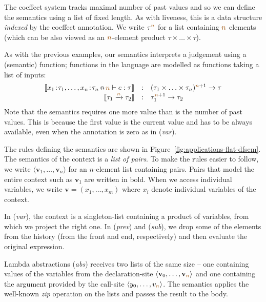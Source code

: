 The coeffect system tracks maximal number of past values and so we can define the semantics using
a list of fixed length. As with liveness, this is a data structure \emph{indexed} by the coeffect
annotation. We write $\tau^{\aclrd{n}}$ for a list containing $\aclrd{n}$ elements (which can be 
also viewed as an $\aclrd{n}$-element product $\tau \times \ldots \times \tau$). 

As with the previous examples, our semantics interprets a judgement using a (semantic) function;
functions in the language are modelled as functions taking a list of inputs:
%
\begin{equation*}
\begin{array}{rcl}
\sem{\coctx{x_1\!:\!\tau_1, \ldots, x_n\!:\!\tau_n}{ \aclrd{n} } \vdash e : \tau} 
  &:& (\tau_1 \times \ldots \times \tau_n)^{\aclrd{n}+1} \rightarrow \tau\\
\sem{\tau_1 \xrightarrow{\aclrd{n}} \tau_2} &:& \tau_1^{\aclrd{n}+1} \rightarrow \tau_2
\end{array}
\end{equation*}
%
Note that the semantics requires one more value than is the number of past values. This is because 
the first value is the current value and has to be always available, even when the annotation is
zero as in (\emph{var}).

The rules defining the semantics are shown in Figure~\ref{fig:applications-flat-dfsem}. The
semantics of the context is a \emph{list of pairs}. To make the rules easier to follow, we write
$\langle \mathbf{v}_1, \ldots, \mathbf{v}_n \rangle$ for an $n$-element list containing pairs.
Pairs that model the entire context such as $\mathbf{v}_1$ are written in bold. When we access
individual variables, we write $\mathbf{v} = (x_1, \ldots, x_m)$ where $x_i$ denote individual
variables of the context.

In (\emph{var}), the context is a singleton-list containing a product of variables, from which
we project the right one. In (\emph{prev}) and (\emph{sub}), we drop some of the elements from 
the history (from the front and end, respectively) and then evaluate the original expression.

Lambda abstractions (\emph{abs}) receives two lists of the same size -- one containing values of
the variables from the declaration-site $\langle \mathbf{v}_0, \ldots, \mathbf{v}_{\aclrd{n}} \rangle$ and one
containing the argument provided by the call-site $\langle y_0, \ldots, v_{\aclrd{n}} \rangle$.
The semantics applies the well-known \emph{zip} operation on the lists and passes the result to the
body.

